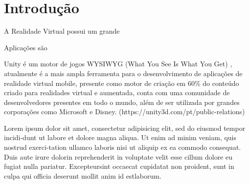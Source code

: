 \section{Introdução}


A Realidade Virtual possui um grande

Aplicações são

Unity é um motor de jogos WYSIWYG (What You See Is What You Get) \cite{sv2015popolin}, atualmente é a mais ampla ferramenta para o desenvolvimento de aplicações de realidade virtual mobile, presente como motor de criação em 60\% do conteúdo criado para realidades virtual e aumentada, conta com uma comunidade de desenvolvedores presentes em todo o mundo, além de ser utilizada por grandes corporações como Microsoft e Disney. (https://unity3d.com/pt/public-relations)


Lorem ipsum dolor sit amet, consectetur adipisicing elit, sed do eiusmod tempor incidi-dunt ut labore et dolore magna aliqua.  Ut enim ad minim veniam, quis nostrud exerci-tation ullamco laboris nisi ut aliquip ex ea commodo consequat.  Duis aute irure dolorin reprehenderit in voluptate velit esse cillum dolore eu fugiat nulla pariatur.  Excepteursint occaecat cupidatat non proident, sunt in culpa qui officia deserunt mollit anim id estlaborum.


